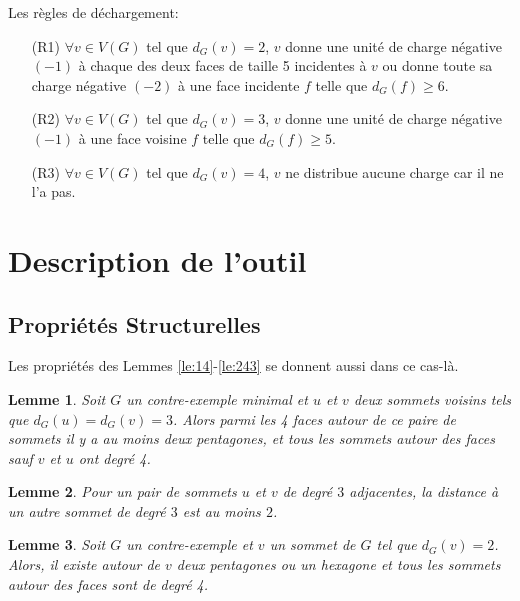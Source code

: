 \documentclass{beamer}
\newtheorem{lemme}{Lemme}
\begin{document}
\begin{frame}
Les règles de déchargement:

\begin{enumerate}
\item [(R1)] $\forall v \in V(G)$ tel que $d_G(v) = 2$, $v$ donne une unité de charge négative $(-1)$ à chaque des deux faces de taille 5 incidentes à $v$ ou donne toute sa charge négative $(-2)$ à une face incidente $f$ telle que $d_G(f) \geq 6$.
\item [(R2)] $\forall v \in V(G)$ tel que $d_G(v) = 3$, $v$ donne une unité de charge négative $(-1)$ à une face voisine $f$ telle que $d_G(f) \geq 5$.
\item [(R3)] $\forall v \in V(G)$ tel que $d_G(v) = 4$, $v$ ne distribue aucune charge car il ne l'a pas.
\end{enumerate}
\end{frame}


\section{Description de l'outil}
\subsection{Propriétés Structurelles}
\begin{frame}
Les propriétés des Lemmes \ref{le:14}-\ref{le:243} se donnent aussi dans ce cas-là.
\end{frame}

\begin{frame}
\begin{lemme}
Soit $G$ un contre-exemple minimal et $u$ et $v$ deux sommets voisins tels que $d_G(u)=d_G(v) = 3$. Alors parmi les 4 faces autour de ce paire de sommets il y a au moins deux pentagones, et tous les sommets autour des faces sauf $v$ et $u$ ont degré 4.
\label{le:33pent}
\end{lemme}
\end{frame}

\begin{frame}
\begin{lemme}
Pour un pair de sommets $u$ et $v$ de degré $3$ adjacentes, la distance à un autre sommet de degré $3$ est au moins $2$.
\label{de:3343}
\end{lemme}
\end{frame}

\begin{frame}
\begin{lemme}
Soit $G$ un contre-exemple et $v$ un sommet de $G$ tel que $d_G(v) = 2$. Alors, il existe autour de $v$ deux pentagones ou un hexagone et tous les sommets autour des faces sont de degré 4.
\label{le:2pent}
\end{lemme}
\end{frame}
\end{document}
